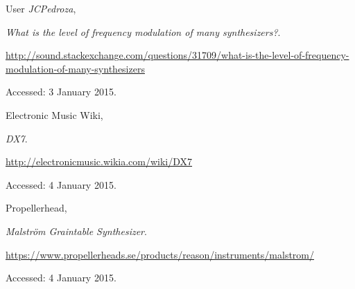\begin{thebibliography}{99}
  User \emph{JCPedroza},

  \emph{What is the level of frequency modulation of many synthesizers?}.

  \url{http://sound.stackexchange.com/questions/31709/what-is-the-level-of-frequency-modulation-of-many-synthesizers}

  Accessed: 3 January 2015.
  
  
	Electronic Music Wiki,
  
	\emph{DX7}.
  
    \url{http://electronicmusic.wikia.com/wiki/DX7}
    
    Accessed: 4 January 2015.
    
    
	Propellerhead,
	
	\emph{Malstr{\"o}m Graintable Synthesizer}.
	
	\url{https://www.propellerheads.se/products/reason/instruments/malstrom/}	
	
	Accessed: 4 January 2015.

\end{thebibliography}
